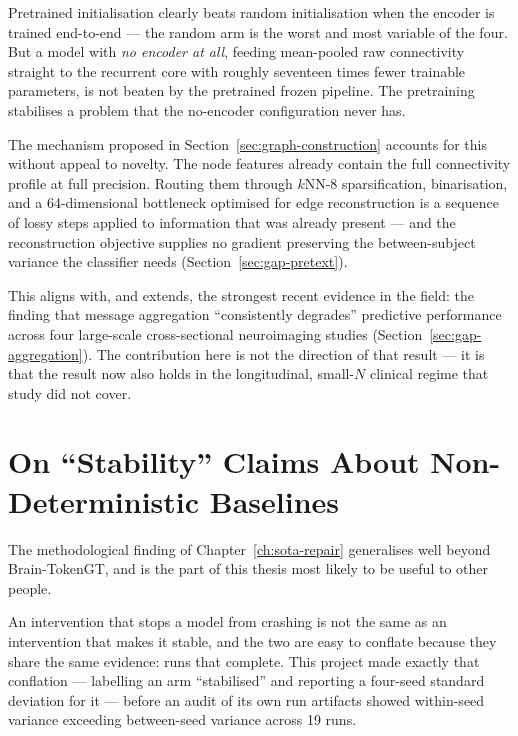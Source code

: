 Pretrained initialisation clearly beats random initialisation when the encoder is trained
end-to-end --- the random arm is the worst and most variable of the four. But a model with
\emph{no encoder at all}, feeding mean-pooled raw connectivity straight to the recurrent
core with roughly seventeen times fewer trainable parameters, is not beaten by the
pretrained frozen pipeline. The pretraining stabilises a problem that the no-encoder
configuration never has.

The mechanism proposed in Section~\ref{sec:graph-construction} accounts for this without
appeal to novelty. The node features already contain the full connectivity profile at full
precision. Routing them through $k$NN-8 sparsification, binarisation, and a 64-dimensional
bottleneck optimised for edge reconstruction is a sequence of lossy steps applied to
information that was already present --- and the reconstruction objective supplies no
gradient preserving the between-subject variance the classifier needs
(Section~\ref{sec:gap-pretext}).

This aligns with, and extends, the strongest recent evidence in the field: the finding that
message aggregation ``consistently degrades'' predictive performance across four large-scale
cross-sectional neuroimaging studies (Section~\ref{sec:gap-aggregation}). The contribution
here is not the direction of that result --- it is that the result now also holds in the
longitudinal, small-$N$ clinical regime that study did not cover.

\section{On ``Stability'' Claims About Non-Deterministic Baselines}
\label{sec:disc-determinism}

The methodological finding of Chapter~\ref{ch:sota-repair} generalises well beyond
Brain-TokenGT, and is the part of this thesis most likely to be useful to other people.

An intervention that stops a model from crashing is not the same as an intervention that
makes it stable, and the two are easy to conflate because they share the same evidence:
runs that complete. This project made exactly that conflation --- labelling an arm
``stabilised'' and reporting a four-seed standard deviation for it --- before an audit of
its own run artifacts showed within-seed variance exceeding between-seed variance across 19
runs.

